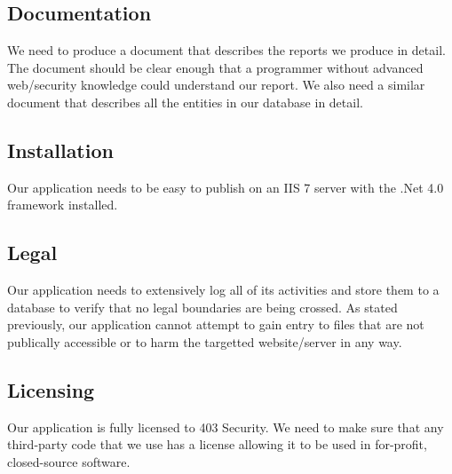 \subsection{Documentation}
We need to produce a document that describes the reports we produce in detail. The document should be clear enough that a programmer without advanced web/security knowledge could understand our report. We also need a similar document that describes all the entities in our database in detail. 
\subsection{Installation}
Our application needs to be easy to publish on an IIS 7 server with the .Net 4.0 framework installed.
\subsection{Legal}
 
Our application needs to extensively log all of its activities and store them to a database to verify that no legal boundaries are being crossed. As stated previously, our application cannot attempt to gain entry to files that are not publically accessible or to harm the targetted website/server in any way.
\subsection{Licensing}
 
Our application is fully licensed to 403 Security. We need to make sure that any third-party code that we use has a license allowing it to be used in for-profit, closed-source software.

